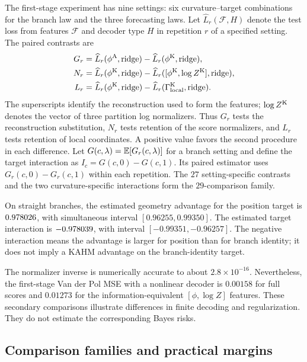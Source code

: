 The first-stage experiment has nine settings: six curvature--target
combinations for the branch law and the three forecasting laws.
Let $\widehat L_r(\mathcal F,H)$ denote the test loss from features
$\mathcal F$ and decoder type $H$ in repetition $r$ of a specified setting.
The paired contrasts are
\begin{align*}
 G_r&=\widehat L_r(\phi^{\mathrm{A}},\mathrm{ridge})
       -\widehat L_r(\phi^{\mathrm{K}},\mathrm{ridge}),\\
 N_r&=\widehat L_r(\phi^{\mathrm{K}},\mathrm{ridge})
       -\widehat L_r([\phi^{\mathrm{K}},\log Z^{\mathrm{K}}],\mathrm{ridge}),\\
 L_r&=\widehat L_r(\phi^{\mathrm{K}},\mathrm{ridge})
       -\widehat L_r(\Gamma_{\mathrm{local}}^{\mathrm{K}},\mathrm{ridge}).
\end{align*}
The superscripts identify the reconstruction used to form the features;
$\log Z^{\mathrm{K}}$ denotes the vector of three partition log normalizers.
Thus $G_r$ tests the reconstruction substitution, $N_r$ tests retention
of the score normalizers, and $L_r$ tests retention of local coordinates.
A positive value favors the second procedure in each difference. Let
$G(c,\lambda)=\mathbb{E}[G_r(c,\lambda)]$ for a branch setting and define the
target interaction as $I_c=G(c,0)-G(c,1)$. Its paired estimator uses
$G_r(c,0)-G_r(c,1)$ within each repetition. The $27$ setting-specific
contrasts and the two curvature-specific interactions form the
$29$-comparison family.

On straight branches, the estimated geometry advantage for the position
target is $0.978026$, with simultaneous interval
$[0.96255,0.99350]$. The estimated target interaction is
$-0.978039$, with interval $[-0.99351,-0.96257]$.
The negative interaction means the advantage is larger for position
than for branch identity; it does not imply a KAHM advantage on the
branch-identity target.

The normalizer inverse is numerically accurate to about
$2.8\times10^{-16}$. Nevertheless, the first-stage Van der Pol MSE
with a nonlinear decoder is $0.00158$ for full scores and $0.01273$
for the information-equivalent $[\phi,\log Z]$ features. These
secondary comparisons illustrate differences in finite decoding and
regularization. They do not estimate the corresponding Bayes risks.

\subsection{Comparison families and practical margins}

